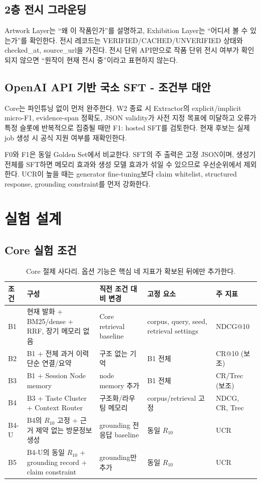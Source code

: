 \documentclass[10pt,a4paper,twocolumn]{article}
\newcommand{\FTModel}{\texttt{gpt-4.1-mini-2025-04-14} (candidate)}
\begin{document}
\subsection{2층 전시 그라운딩}
Artwork Layer는 ``왜 이 작품인가''를 설명하고, Exhibition Layer는 ``어디서 볼 수 있는가''를 확인한다. 전시 레코드는 VERIFIED/CACHED/UNVERIFIED 상태와 checked\_at, source\_url을 가진다. 전시 단위 API만으로 작품 단위 전시 여부가 확인되지 않으면 ``원작이 현재 전시 중''이라고 표현하지 않는다.

\subsection{OpenAI API 기반 국소 SFT - 조건부 대안}
Core는 파인튜닝 없이 먼저 완주한다. W2 종료 시 Extractor의 explicit/implicit micro-F1, evidence-span 정확도, JSON validity가 사전 지정 목표에 미달하고 오류가 특정 슬롯에 반복적으로 집중될 때만 F1: hosted SFT를 검토한다. 현재 후보는  실제 job 생성 시 공식 지원 여부를 재확인한다.

F0와 F1은 동일 Golden Set에서 비교한다. SFT의 주 출력은 고정 JSON이며, 생성기 전체를 SFT하면 메모리 효과와 생성 모델 효과가 섞일 수 있으므로 우선순위에서 제외한다. UCR이 높을 때는 generator fine-tuning보다 claim whitelist, structured response, grounding constraint를 먼저 강화한다.

\section{실험 설계}
\subsection{Core 실험 조건}
\begin{table}[t]
\centering
\caption{Core 절제 사다리. 옵션 기능은 핵심 네 지표가 확보된 뒤에만 추가한다.}
\label{tab:conditions}
\small
\begin{tabularx}{0.97\textwidth}{@{}p{}p{}X p{}p{}@{}}
\toprule
조건 & 구성 & 직전 조건 대비 변경 & 고정 요소 & 주 지표 \\
\midrule
B1 & 현재 발화 + BM25/dense + RRF, 장기 메모리 없음 & Core retrieval baseline & corpus, query, seed, retrieval settings & NDCG@10 \\
B2 & B1 + 전체 과거 이력 단순 연결/요약 & 구조 없는 기억 & B1 전체 & CR@10 (보조) \\
B3 & B1 + Session Node memory & node memory 추가 & B1 전체 & CR/Trec (보조) \\
B4 & B3 + Taste Cluster + Context Router & 구조화/라우팅 메모리 & corpus/retrieval 고정 & NDCG, CR, Trec \\
B4-U & B4의 $R_{10}$ 고정 + 근거 제약 없는 방문정보 생성 & grounding 전 응답 baseline & 동일 $R_{10}$ & UCR \\
B5 & B4-U의 동일 $R_{10}$ + grounding record + claim constraint & grounding만 추가 & 동일 $R_{10}$ & UCR \\
\bottomrule
\end{tabularx}
\end{table}
\end{document}
